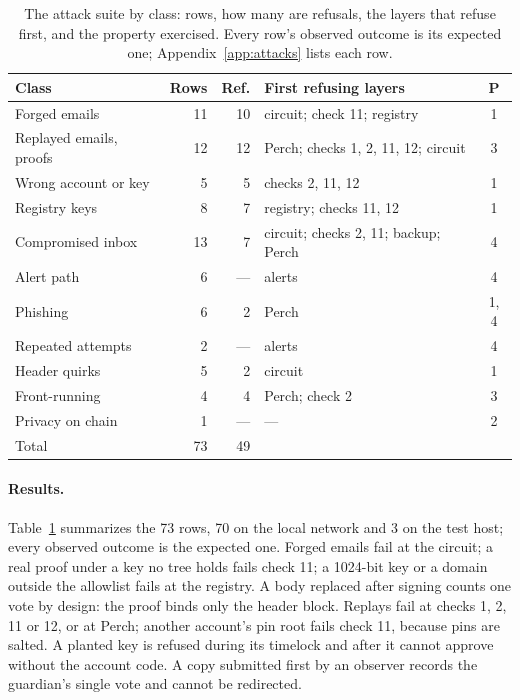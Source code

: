\begin{table}[t]
  \caption{The attack suite by class: rows, how many are refusals, the layers
    that refuse first, and the property exercised. Every row's observed
    outcome is its expected one; Appendix~\ref{app:attacks} lists each row.}
  \label{tab:attack-summary}
  \small
  \begin{tabularx}{\columnwidth}{@{}>{\raggedright\arraybackslash}X r r >{\raggedright\arraybackslash}p{} c@{}}
    \toprule
    Class & Rows & Ref. & First refusing layers & P \\
    \midrule
    Forged emails & 11 & 10 & circuit; check 11; registry & 1 \\
    Replayed emails, proofs & 12 & 12 & Perch; checks 1, 2, 11, 12; circuit & 3 \\
    Wrong account or key & 5 & 5 & checks 2, 11, 12 & 1 \\
    Registry keys & 8 & 7 & registry; checks 11, 12 & 1 \\
    Compromised inbox & 13 & 7 & circuit; checks 2, 11; backup; Perch & 4 \\
    Alert path & 6 & --- & alerts & 4 \\
    Phishing & 6 & 2 & Perch & 1, 4 \\
    Repeated attempts & 2 & --- & alerts & 4 \\
    Header quirks & 5 & 2 & circuit & 1 \\
    Front-running & 4 & 4 & Perch; check 2 & 3 \\
    Privacy on chain & 1 & --- & --- & 2 \\
    \midrule
    Total & 73 & 49 & & \\
    \bottomrule
  \end{tabularx}
\end{table}

\paragraph{Results.} Table~\ref{tab:attack-summary} summarizes the 73 rows,
70 on the local network and 3 on the test host; every observed outcome is the
expected one. Forged
emails fail at the circuit; a real proof under a key no tree holds fails
check 11; a 1024-bit key or a domain outside the allowlist fails at the
registry. A body replaced after signing counts one vote by design: the proof
binds only the header block. Replays fail at checks 1, 2, 11 or 12, or at
Perch; another account's pin root fails check 11, because pins are salted. A
planted key is refused during its timelock and after it cannot approve
without the account code. A copy submitted first by an observer records the
guardian's single vote and cannot be redirected.

